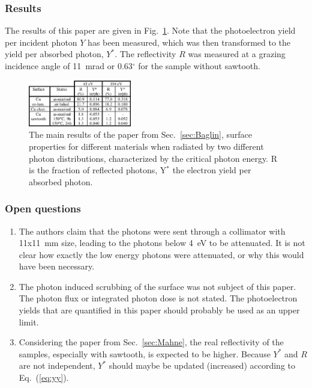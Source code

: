 \subsubsection{Results}
The results of this paper are given in Fig.~\ref{fig:baglin_table}.
Note that the photoelectron yield per incident photon $Y$ has been measured, which was then transformed to the yield per absorbed photon, $Y^*$.
The reflectivity $R$ was measured at a grazing incidence angle of 11~mrad or 0.63$^\circ$ for the sample without sawtooth.


\begin{figure}[tbh]
    \centering
    \includegraphics[width=0.4\textwidth]{../ss/baglin_table.png}
    \caption{
        The main results of the paper from Sec.~\ref{sec:Baglin}, surface properties for different materials when radiated by two different photon distributions, characterized by the critical photon energy. 
        R is the fraction of reflected photons, Y$^*$ the electron yield per absorbed photon.}
    \label{fig:baglin_table}
\end{figure}

\subsubsection{Open questions}
\begin{enumerate}
    \item
        The authors claim that the photons were sent through a collimator with 11x11~mm size, leading to the photons below 4~eV to be attenuated.
        It is not clear how exactly the low energy photons were attenuated, or why this would have been necessary.
    \item
        The photon induced scrubbing of the surface was not subject of this paper.
        The photon flux or integrated photon dose is not stated.
        The photoelectron yields that are quantified in this paper should probably be used as an upper limit.
    \item
        Considering the paper from Sec.~\ref{sec:Mahne}, the real reflectivity of the samples, especially with sawtooth, is expected to be higher.
        Because $Y^*$ and $R$ are not independent, $Y^*$ should maybe be updated (increased) according to Eq.~(\ref{eq:yy}).
\end{enumerate}

